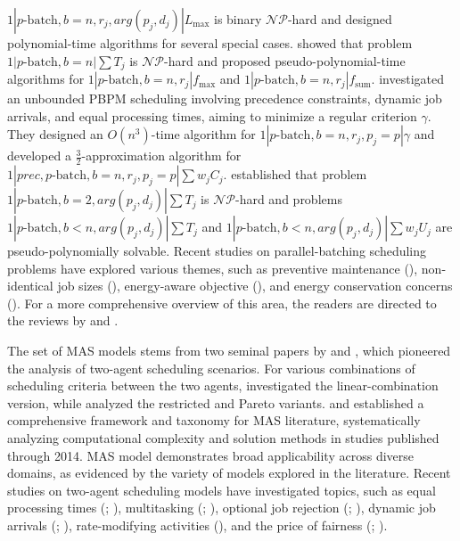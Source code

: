 \documentclass[12pt]{article}
\begin{document}
\begin{sloppypar}
$1 | p\text{-batch}, b = n, r_j, arg(p_j, d_j)| L_{\max}$ is binary $\mathcal{NP}$-hard and designed polynomial-time algorithms for several special cases. \cite{LiuYuanCheng2003ORL} showed that  problem $1 | p\text{-batch}, b = n| \sum T_j$ is $\mathcal{NP}$-hard and proposed pseudo-polynomial-time algorithms for $1 | p\text{-batch}, b = n, r_j| f_{\max}$ and $1 | p\text{-batch}, b = n, r_j| f_{\mathrm{sum}}$. \cite{ChengYuanYang2005COR} investigated an unbounded PBPM scheduling involving precedence constraints, dynamic job arrivals, and equal processing times, aiming to minimize a regular criterion $\gamma$. They designed an $O(n^3)$-time algorithm for $1 | p\text{-batch}, b = n, r_j, p_j=p| \gamma$ and developed a $\frac{3}{2}$-approximation algorithm for $1 | prec, p\text{-batch}, b = n, r_j, p_j=p| \sum w_j C_j$. \cite{LiuNgCheng2007TCS} established that problem $1 | p\text{-batch}, b =2, arg(p_j, d_j)| \sum T_j$ is $\mathcal{NP}$-hard and problems $1 | p\text{-batch}, b <n, arg(p_j, d_j)| \sum T_j$ and $1 | p\text{-batch}, b <n, arg(p_j, d_j)| \sum w_jU_j$ are pseudo-polynomially solvable. Recent studies on parallel-batching scheduling problems have explored various themes, such as preventive maintenance (\citealp{HuangWangJiang2020IJPR}), non-identical job sizes (\citealp{ZhouJinLiu2022ESA}), energy-aware objective (\citealp{KucukkocKK2024IJPR}), and energy conservation concerns (\citealp{KongWang2024IJPR}). For a more comprehensive overview of this area, the readers are directed to the reviews by \cite{MonchFowler2011JOS} and \cite{FowlerMonch2022EJOR}.

The set of MAS models stems from two seminal papers by \cite{BakerSmithJOS2003} and \cite{AgnetisMirchandani2004OR}, which pioneered the analysis of two-agent scheduling scenarios. For various combinations of scheduling criteria between the two agents, \cite{BakerSmithJOS2003} investigated the linear-combination version, while \cite{AgnetisMirchandani2004OR} analyzed
the restricted and Pareto variants. \cite{AgnetisBillaut2014Springer} and \cite{PerezGonzalez2014EJOR} established a comprehensive framework and taxonomy for MAS literature, systematically analyzing computational complexity and solution methods in studies published through 2014. MAS model demonstrates broad applicability across diverse domains, as evidenced by the variety of models explored in the literature. Recent studies on two-agent scheduling models have investigated topics, such as equal processing times (\citealp{ZhaoYuan2020JOCO}; \citealp{ChenRB2022EJOR}), multitasking (\citealp{LiChenTian2020EngineeringOptimization}; \citealp{WangYuYin2021IJPR}), optional job rejection (\citealp{OronDaniel2021Omega}; \citealp{FreudMosheiov2021COR}), dynamic job arrivals (\citealp{LiChen2023JOS}; \citealp{WangRenBai2024IJPR}), rate-modifying activities (\citealp{PhosavanhOron2024EJOR}), and the price of fairness (\citealp{AgnetisChen2019EJOR}; \citealp{YuLiuLuGu2025EJOR}). 


\end{sloppypar}
\end{document}
